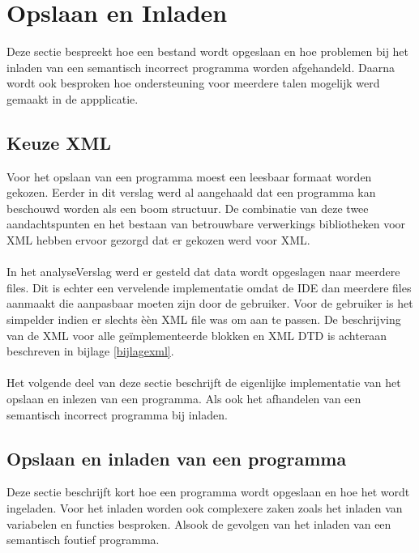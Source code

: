 \documentclass[]{article}
\begin{document}
\section{Opslaan en Inladen}
Deze sectie bespreekt hoe een bestand wordt opgeslaan en hoe problemen bij het inladen van een semantisch incorrect programma worden afgehandeld. Daarna wordt ook besproken hoe ondersteuning voor meerdere talen mogelijk werd gemaakt in de appplicatie.
\subsection{Keuze XML}
\label{XML}
Voor het opslaan van een programma moest een leesbaar formaat worden gekozen. Eerder in dit verslag werd al aangehaald dat een programma kan beschouwd worden als een boom structuur. De combinatie van deze twee aandachtspunten en het bestaan van betrouwbare verwerkings bibliotheken voor XML hebben ervoor gezorgd dat er gekozen werd voor XML.\\\\
In het analyseVerslag werd er gesteld dat data wordt opgeslagen naar meerdere files. Dit is echter een vervelende implementatie omdat de IDE dan meerdere files aanmaakt die aanpasbaar moeten zijn door de gebruiker. Voor de gebruiker is het simpelder indien er slechts \`e\`en XML file was om aan te passen. De beschrijving van de XML voor alle ge\"{i}mplementeerde blokken en XML DTD is achteraan beschreven in bijlage \ref{bijlagexml}.\\\\
Het volgende deel van deze sectie beschrijft de eigenlijke implementatie van het opslaan en inlezen van een programma. Als ook het afhandelen van een semantisch incorrect programma bij inladen.
\subsection{Opslaan en inladen van een programma}
\label{saveLoad}
Deze sectie beschrijft kort hoe een programma wordt opgeslaan en hoe het wordt ingeladen. Voor het inladen worden ook complexere zaken zoals het inladen van variabelen en functies besproken. Alsook de gevolgen van het inladen van een semantisch foutief programma.
\end{document}
